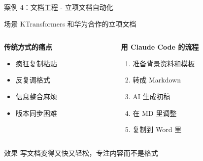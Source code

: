 \documentclass[aspectratio=169,xcolor=dvipsnames]{beamer}
\begin{document}
\begin{frame}{案例 4：文档工程 - 立项文档自动化}
  \begin{block}{场景}
    KTransformers 和华为合作的立项文档
  \end{block}

  \begin{columns}
    \begin{column}{0.48\textwidth}
      \textbf{传统方式的痛点}
      \begin{itemize}
        \item 疯狂复制粘贴
        \item 反复调格式
        \item 信息整合麻烦
        \item 版本同步困难
      \end{itemize}
    \end{column}
    \begin{column}{0.48\textwidth}
      \textbf{用 Claude Code 的流程}
      \begin{enumerate}
        \item 准备背景资料和模板
        \item 转成 Markdown
        \item AI 生成初稿
        \item 在 MD 里调整
        \item 复制到 Word 里
      \end{enumerate}
    \end{column}
  \end{columns}

  \vspace{0.3cm}

  \begin{exampleblock}{效果}
    写文档变得又快又轻松，专注内容而不是格式
  \end{exampleblock}
\end{frame}
\end{document}
